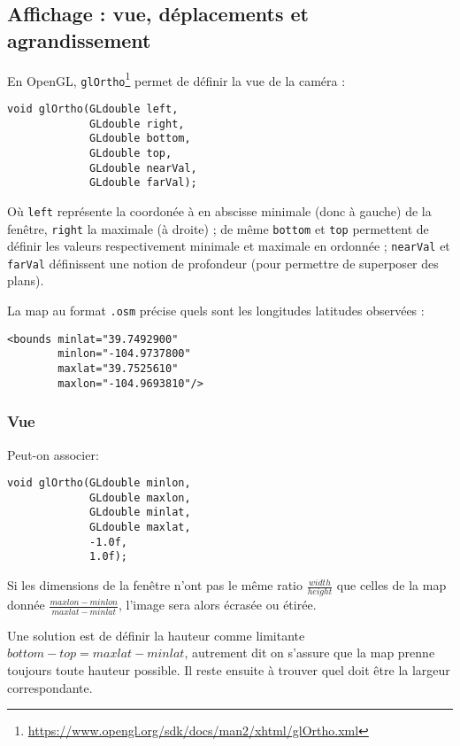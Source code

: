 \subsection{Affichage : vue, déplacements et agrandissement}

En OpenGL, \texttt{glOrtho}\footnote{\url{https://www.opengl.org/sdk/docs/man2/xhtml/glOrtho.xml}}
permet de définir la vue de la caméra :

\begin{lstlisting}
void glOrtho(GLdouble left,
             GLdouble right,
             GLdouble bottom,
             GLdouble top,
             GLdouble nearVal,
             GLdouble farVal);
\end{lstlisting}

Où \texttt{left} représente la coordonée à en abscisse minimale (donc à gauche) de la fenêtre,
\texttt{right} la maximale (à droite) ; de même \texttt{bottom} et \texttt{top} permettent de
définir les valeurs respectivement minimale et maximale en ordonnée ; \texttt{nearVal} et
\texttt{farVal} définissent une notion de profondeur (pour permettre de superposer des plans).

\vspace{5mm}

La map au format \texttt{.osm} précise quels sont les longitudes latitudes observées :

\begin{lstlisting}
<bounds minlat="39.7492900"
        minlon="-104.9737800"
        maxlat="39.7525610"
        maxlon="-104.9693810"/>
\end{lstlisting}

\subsubsection{Vue}

Peut-on associer:
\begin{lstlisting}
void glOrtho(GLdouble minlon,
             GLdouble maxlon,
             GLdouble minlat,
             GLdouble maxlat,
             -1.0f,
             1.0f);
\end{lstlisting}

Si les dimensions de la fenêtre n'ont pas le même ratio $\frac{width}{height}$ que celles de la map donnée $\frac{maxlon-minlon}{maxlat-minlat}$,
l'image sera alors écrasée ou étirée.

\vspace{10mm}

Une solution est de définir la hauteur comme limitante $bottom-top = maxlat-minlat$,
autrement dit on s'assure que la map prenne toujours toute hauteur possible.
Il reste ensuite à trouver quel doit être la largeur correspondante.

